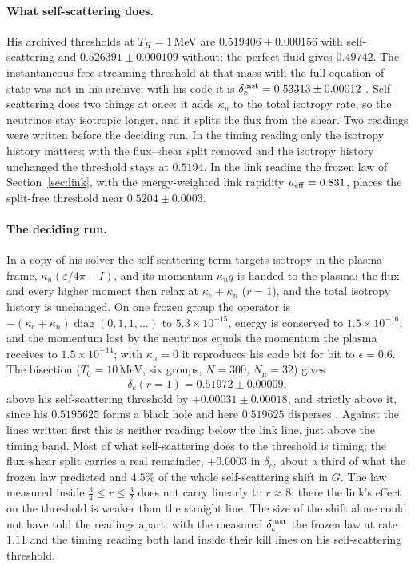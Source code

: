 \paragraph{What self-scattering does.} His archived thresholds at $T_H=1$\,MeV are $0.519406\pm0.000156$ with self-scattering and $0.526391\pm0.000109$ without; the perfect fluid gives $0.49742$. The instantaneous free-streaming threshold at that mass with the full equation of state was not in his archive; with his code it is $\delta_c^{\rm inst}=0.53313\pm0.00012$ . Self-scattering does two things at once: it adds $\kappa_n$ to the total isotropy rate, so the neutrinos stay isotropic longer, and it splits the flux from the shear. Two readings were written before the deciding run. In the timing reading only the isotropy history matters; with the flux--shear split removed and the isotropy history unchanged the threshold stays at $0.5194$. In the link reading the frozen law of Section~\ref{sec:link}, with the energy-weighted link rapidity $u_{\rm eff}=0.831$, places the split-free threshold near $0.5204\pm0.0003$.

\paragraph{The deciding run.} In a copy of his solver the self-scattering term targets isotropy in the plasma frame, $\kappa_n(\varepsilon/4\pi-I)$, and its momentum $\kappa_nq$ is handed to the plasma: the flux and every higher moment then relax at $\kappa_e+\kappa_n$ ($r=1$), and the total isotropy history is unchanged. On one frozen group the operator is $-(\kappa_e+\kappa_n)\operatorname{diag}(0,1,1,\dots)$ to $5.3\times10^{-15}$, energy is conserved to $1.5\times10^{-16}$, and the momentum lost by the neutrinos equals the momentum the plasma receives to $1.5\times10^{-14}$; with $\kappa_n=0$ it reproduces his code bit for bit to $\epsilon=0.6$. The bisection ($T_0=10$\,MeV, six groups, $N=300$, $N_\mu=32$) gives
\begin{equation}
\delta_c(r=1)=0.51972\pm0.00009,
\end{equation}
above his self-scattering threshold by $+0.00031\pm0.00018$, and strictly above it, since his $0.5195625$ forms a black hole and here $0.519625$ disperses . Against the lines written first this is neither reading: below the link line, just above the timing band. Most of what self-scattering does to the threshold is timing; the flux--shear split carries a real remainder, $+0.0003$ in $\delta_c$, about a third of what the frozen law predicted and $4.5\%$ of the whole self-scattering shift in $G$. The law measured inside $\tfrac34\le r\le\tfrac32$ does not carry linearly to $r\approx8$; there the link's effect on the threshold is weaker than the straight line. The size of the shift alone could not have told the readings apart: with the measured $\delta_c^{\rm inst}$ the frozen law at rate $1.11$ and the timing reading both land inside their kill lines on his self-scattering threshold.

